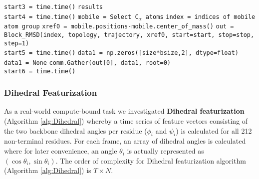 \begin{algorithm}[ht]
\begin{algorithmic}[1]
        \State \texttt{start3 = time.time()}
        \State \Return \texttt{results}
        \EndProcedure
        \\        
        \State \texttt{start4 = time.time()}
        \State \texttt{mobile =  Select C$_{\alpha}$ atoms}
        \State \texttt{index = indices of mobile atom group}
        \State \texttt{xref0 = mobile.positions-mobile.center\_of\_mass()}
	\State \texttt{out = Block\_RMSD(index, topology, trajectory, xref0, start=start, stop=stop, step=1)}
	\\
	\State \texttt{start5 = time.time()}
   	     \State \texttt{data1 = np.zeros([size*bsize,2], dtype=float)}
	\Else
   	     \State \texttt{data1 = None}
              \State \texttt{comm.Gather(out[0], data1, root=0)}
        \EndIf
         \\
         \State \texttt{start6 = time.time()}
    \end{algorithmic}
\end{algorithm}


\subsubsection{Dihedral Featurization}
As a real-world compute-bound task we investigated \textbf{Dihedral featurization} \cite{Sittel:2014aa} (Algorithm \ref{alg:Dihedral}) whereby a time series of
feature vectors consisting of the two backbone dihedral angles per residue ($\phi_{i}$ and $\psi_{i}$) is calculated for all 212
non-terminal residues. For each frame, an array of dihedral angles is calculated where for later convenience, an angle $\theta_{i}$ is
actually represented as $(\cos\theta_{i}, \sin\theta_{i})$. 
The order of complexity for Dihedral featurization algorithm (Algorithm \ref{alg:Dihedral}) is $T \times N$. 

